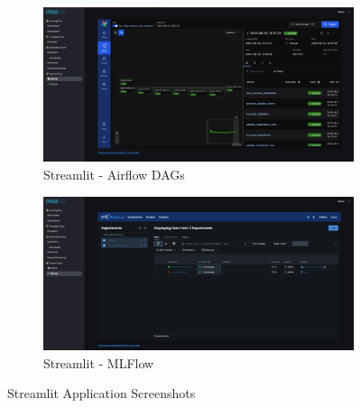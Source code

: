 \begin{figure}[H]
    \begin{subfigure}[b]{0.45\textwidth}
        \includegraphics[width=\linewidth]{latex/imgs/app/airflow_data_pipeline.png}
        \caption{Streamlit - Airflow DAGs}
        \label{fig:airflow-dags}
    \end{subfigure}
    \hfill
    \begin{subfigure}[b]{0.45\textwidth}
        \includegraphics[width=\linewidth]{latex/imgs/app/mlflow_experiments.png}
        \caption{Streamlit - MLFlow}
        \label{fig:mlflow}
    \end{subfigure}
    
    \caption{Streamlit Application Screenshots}
    \label{fig:streamlit-app}
\end{figure}


